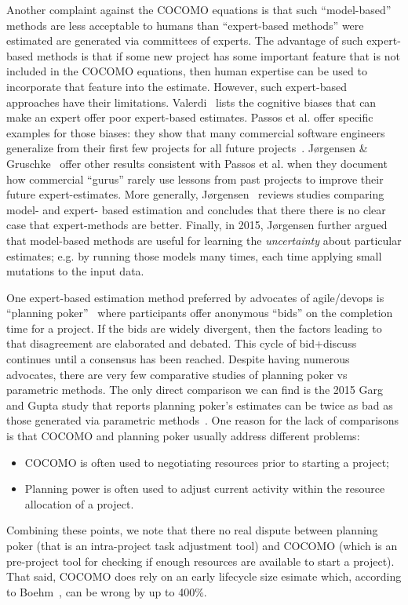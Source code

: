 \documentclass[final,twocolumn,5p]{elsarticle}
\newcommand{\bi}{\begin{itemize}[leftmargin=0.4cm]}
\newcommand{\ei}{\end{itemize}}
\theoremstyle{break}
\begin{document}
Another complaint against the COCOMO equations is
that such ``model-based'' methods are less
acceptable to humans than ``expert-based methods''
were estimated are generated via committees of
experts. The advantage of such expert-based methods
is that if some new project has some important
feature that is not included in the COCOMO
equations, then human expertise can be used to
incorporate that feature into the estimate.
However,
such expert-based approaches have their limitations.
Valerdi~\cite{valerdi11} lists the cognitive biases
that can make an expert offer poor expert-based estimates.
Passos et al. offer specific examples for those
biases: they show that many commercial software
engineers generalize from their first few projects
for all future projects~\cite{passos11}.  J{\o}rgensen
\& Gruschke~\cite{jorgensen09} offer other results
consistent with Passos et al.  when they document
how commercial ``gurus'' rarely use lessons from
past projects to improve their future
expert-estimates.  More generally,
J{\o}rgensen~\cite{Jorgensen2004} reviews studies
comparing model- and expert- based estimation and
concludes that there there is no clear case that
expert-methods are better.  Finally, in 2015,
J{\o}rgensen further argued~\cite{jorg15} that
model-based methods are useful for learning the {\em
  uncertainty} about particular estimates; e.g.  by
running those models many times, each time applying
small mutations to the input data.

 One expert-based estimation method preferred by advocates of
 agile/devops is ``planning poker''~\cite{molokk08}
 where participants offer anonymous ``bids'' on the
 completion time for a project. If the bids are
 widely divergent, then the factors leading to that
 disagreement are elaborated and debated. This cycle
 of bid+discuss continues until a consensus has been
 reached.  Despite having numerous advocates,
 there are very few comparative studies of planning
 poker vs parametric methods. The only direct
 comparison we can find is the 2015 Garg and Gupta
 study that reports planning poker's estimates can be
 twice as bad as those generated via parametric
 methods~\cite{garg15}. One reason for the lack of
 comparisons is that COCOMO and planning poker
 usually address different problems: \bi
\item COCOMO is often used to negotiating resources prior to starting a project;
\item Planning power is often used to adjust current activity within the resource allocation of a project.
  \ei
  Combining these  points, we note that there no real dispute between planning poker (that is an intra-project
task adjustment tool) and COCOMO (which is an pre-project tool for checking if enough resources are available
to start a project).
That said, COCOMO does rely on an early lifecycle size esimate which, according to Boehm~\cite{boehm81}, can be wrong
by up to 400\%.
\end{document}
